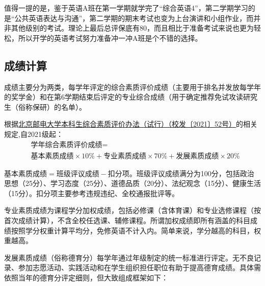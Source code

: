 值得一提的是，鉴于英语A班在第一学期就学完了“综合英语4”，第二学期学习的是“公共英语表达与沟通”，第二学期的期末考试也变为上台演讲和小组作业，而并非其他级别的考试。理论上最后总评保底有80，而且相比于准备考试来说也更为轻松，所以开学的英语考试努力准备冲一冲A班是个不错的选择。

\subsection{成绩计算}


成绩主要分为两类，每学年评定的综合素质评价成绩（主要用于排名并发放每学年的奖学金）和在第6学期结束后评定的专业综合成绩（用于确定推荐免试攻读研究生（俗称保研）的名单）。

根据\href{http://my.bupt.edu.cn/content.jsp?urltype=news.NewsContentUrl&wbtreeid=1025&wbnewsid=95500}{北京邮电大学本科生综合素质评价办法（试行）（校发〔2021〕52号）}的相关规定,自2021级起：
\begin{equation*}
    \begin{aligned}
        &\text{学年综合素质评价成绩}=\\
        &\text{基本素质成绩}\times10\%+\text{专业素质成绩}\times70\%+\text{发展素质成绩}\times20\%
    \end{aligned}
\end{equation*}

$\text{基本素质成绩}=\text{班级评议成绩}-\text{扣分项}$。班级评议成绩满分为100分，包括政治思想（25分）、学习态度（25分）、道德品质（20分）、法纪观念（15分）、健康生活（15分）。扣分项主要参考违规违纪、全校通报批评等。

专业素质成绩为课程学分加权成绩，包括必修课（含体育课）和专业选修课程（按首次成绩计算），不含全校任选课、辅修课程。所谓加权成绩即所有涵盖的科目成绩按照学分权重计算平均分，免修英语不计入内。简单来说，学分越高的科目，权重越高。

发展素质成绩（俗称德育分）每学年通过年级制定的统一标准进行评定。无不良记录、参加志愿活动、实践活动和在学生组织担任职位有助于提高德育成绩。具体需依照当年的德育分评定细则，但大致组成框架如下：

